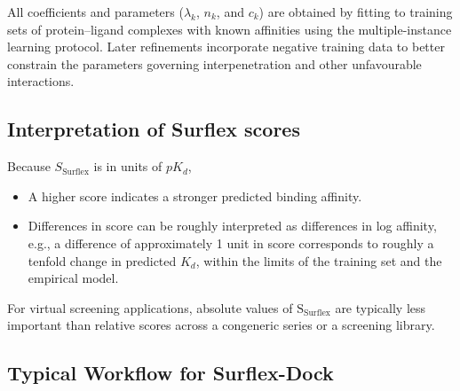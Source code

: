 \documentclass[12pt]{article}
\begin{document}
All coefficients and parameters ($\lambda_{k}$, $n_{k}$, and $c_{k}$) are obtained by fitting to training sets of protein--ligand complexes with known affinities using the multiple-instance learning protocol. Later refinements incorporate negative training data to better constrain the parameters governing interpenetration and other unfavourable interactions\cite{CH7_Jain2006NegTrain}.

\subsection{Interpretation of Surflex scores}

Because \(S_{\textrm{Surflex}}\) is in units of $pK_d$,
\begin{itemize}
  \item A higher score indicates a stronger predicted binding affinity.
  \item Differences in score can be roughly interpreted as differences in log affinity, e.g., a difference of approximately 1 unit in score corresponds to roughly a tenfold change in predicted \(K_d\), within the limits of the training set and the empirical model.
\end{itemize}

For virtual screening applications, absolute values of $\textrm{S}_{\textrm{Surflex}}$ are typically less important than relative scores across a congeneric series or a screening library\cite{CH7_Jain2007Surflex21,CH7_Jain2006NegTrain}.


\subsection{Typical Workflow for Surflex-Dock}
\end{document}
